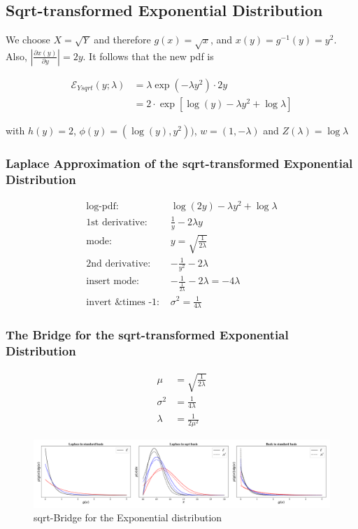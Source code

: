 \subsection{Sqrt-transformed Exponential Distribution}

We choose $X = \sqrt{Y}$ and therefore $g(x) = \sqrt{x}$, and $x(y) = g^{-1}(y) = y^2$. Also, $\left\vert \frac{\partial x(y)}{\partial y}\right\vert = 2y$. It follows that the new pdf is 

\begin{subequations}
\begin{align}
\mathcal{E}_{Ysqrt}(y; \lambda) &= \lambda \exp(-\lambda y^2) \cdot 2y \\
&= 2 \cdot \exp\left[\log(y)-\lambda y^2 + \log\lambda\right]
\end{align}
\end{subequations}

with $h(y)=2$, $\phi(y) = (\log(y), y^2))$, $w = (1, -\lambda)$ and $Z(\lambda)=\log\lambda$

\subsubsection{Laplace Approximation of the sqrt-transformed Exponential Distribution}

\begin{align*}
\text{log-pdf: } & \log(2y)-\lambda y^2 + \log\lambda \\
\text{1st derivative: }& \frac{1}{y} - 2\lambda y \\
\text{mode: } & y = \sqrt{\frac{1}{2\lambda}}\\
\text{2nd derivative: }& -\frac{1}{y^2} - 2\lambda\\
\text{insert mode: }& -\frac{1}{\frac{1}{2\lambda}} - 2\lambda = -4\lambda\\
\text{invert \& times -1: }&\sigma^2 = \frac{1}{4\lambda}
\end{align*}

\subsubsection{The Bridge for the sqrt-transformed Exponential Distribution}

\begin{subequations}
\begin{align}
	\mu &= \sqrt{\frac{1}{2\lambda}} \\
	\sigma^2 &= \frac{1}{4\lambda} \\
	\lambda &= \frac{1}{2\mu^2}
\end{align}
\end{subequations}

\begin{figure}[!htb]
	\centering
	\includegraphics[width=\textwidth]{figures/exponential_sqrt_bridge.pdf}
	\caption{sqrt-Bridge for the Exponential distribution}
	\label{fig:exponential_sqrt_bridge}
\end{figure}